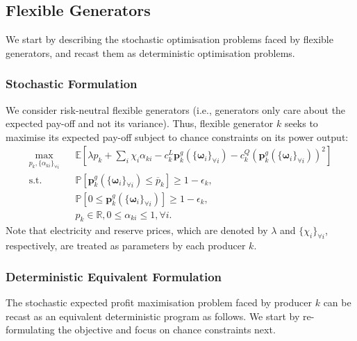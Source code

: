 \documentclass{article}
\begin{document}
\subsection{Flexible Generators}

We start by describing the stochastic optimisation problems faced by flexible generators, and recast them as deterministic optimisation problems.

\subsubsection{Stochastic Formulation}

We consider risk-neutral flexible generators (i.e., generators only care about the expected pay-off and not its variance). Thus, flexible generator $k$ seeks to maximise its expected pay-off subject to chance constraints on its power output:
\begin{align}
\underset{p_k, \{\alpha_{ki}\}_{\forall i}}{\max} \hspace{10pt} & \mathbb{E}[\lambda p_k + \sum_i \chi_i \alpha_{ki} - c_k^L \mathbf{p}_k^g(\{\boldsymbol{\omega}_i\}_{\forall i}) - c_k^Q (\mathbf{p}_k^g(\{\boldsymbol{\omega}_i\}_{\forall i}))^2]\\
\mbox{s.t. } & \mathbb{P}[\mathbf{p}_k^g(\{\boldsymbol{\omega}_i\}_{\forall i}) \le \overline{p}_k] \ge 1 - \epsilon_k,\\
& \mathbb{P}[0 \le \mathbf{p}_k^g(\{\boldsymbol{\omega}_i\}_{\forall i})] \ge 1 - \epsilon_k,\\
&p_k \in \mathbb{R}, 0 \le \alpha_{ki} \le 1, \forall i.
\end{align}
Note that electricity and reserve prices, which are denoted by $\lambda$ and $\{\chi_i\}_{\forall i}$, respectively, are treated as parameters by each producer $k$.
\subsubsection{Deterministic Equivalent Formulation}

The stochastic expected profit maximisation problem faced by producer $k$ can be recast as an equivalent deterministic program as follows. We start by re-formulating the objective and focus on chance constraints next.
\end{document}
